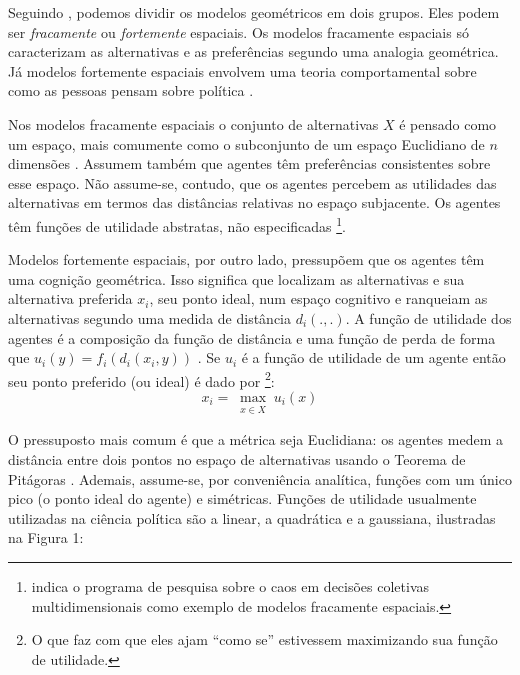 Seguindo , podemos dividir os modelos
geométricos em dois grupos. Eles podem ser \textit{fracamente} ou
\textit{fortemente} espaciais. Os modelos fracamente espaciais só caracterizam
as alternativas e as preferências segundo uma analogia geométrica. Já modelos
fortemente espaciais envolvem uma teoria comportamental sobre como as pessoas
pensam sobre política \cite{laver2014measuring}.


Nos modelos fracamente espaciais o conjunto de alternativas \(X\) é pensado como
um espaço, mais comumente como o subconjunto de um espaço Euclidiano de \(n\)
dimensões \cite{austen1998social}. Assumem também que agentes têm preferências
consistentes sobre esse espaço. Não assume-se, contudo, que os agentes percebem
as utilidades das alternativas em termos das distâncias relativas no espaço
subjacente. Os agentes têm funções de utilidade abstratas, não especificadas
\cite{humphreys2010spatial}\footnote{ indica o
  programa de pesquisa sobre o caos em decisões coletivas multidimensionais como
  exemplo de modelos fracamente espaciais.}.

Modelos fortemente espaciais, por outro lado, pressupõem que os agentes têm uma
cognição geométrica. Isso significa que localizam as alternativas e sua
alternativa preferida \(x_i\), seu ponto ideal, num espaço cognitivo e
ranqueiam as alternativas segundo uma medida de distância \(d_i(.,.)\). A função
de utilidade dos agentes é a composição da função de distância e uma função de
perda de forma que \(u_i(y) = f_i(d_i(x_i,y)) \) \cite{humphreys2010spatial,
  laver2014measuring}. Se \(u_i\) é a função de utilidade de um agente então seu
ponto preferido (ou ideal) é dado por \cite{binmore2008rational}\footnote{O que
  faz com que eles ajam ``como se'' estivessem maximizando sua função de
  utilidade.}:
\[x_i =\max_{\substack{x \in X}}u_i(x) \]


O pressuposto mais comum é que a métrica seja Euclidiana: os agentes medem a
distância entre dois pontos no espaço de alternativas usando o Teorema de
Pitágoras \cite{munger2015choosing}. Ademais, assume-se, por conveniência
analítica, funções com um único pico (o ponto ideal do agente) e simétricas.
Funções de utilidade usualmente utilizadas na ciência política são a linear, a
quadrática e a gaussiana, ilustradas na Figura 1:

